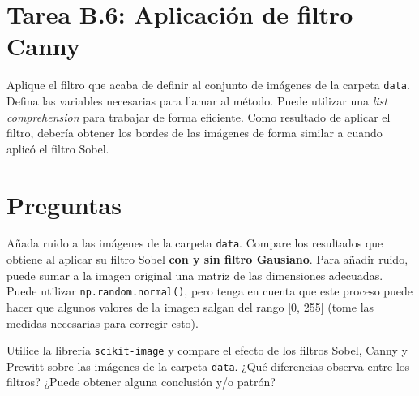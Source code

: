 \section*{Tarea B.6: Aplicación de filtro Canny}
{}

Aplique el filtro que acaba de definir al conjunto de imágenes de la carpeta \texttt{data}. Defina las variables necesarias para llamar al método. Puede utilizar una \textit{list comprehension} para trabajar de forma eficiente. Como resultado de aplicar el filtro, debería obtener los bordes de las imágenes de forma similar a cuando aplicó el filtro Sobel.

\section*{Preguntas}

\vspace{5mm}
\begin{tcolorbox}[colback=gray!10, colframe=gray!30, coltitle=black, title=Pregunta B.1, halign=left]
Añada ruido a las imágenes de la carpeta \texttt{data}. Compare los resultados que obtiene al aplicar su filtro Sobel \textbf{con y sin filtro Gausiano}. Para añadir ruido, puede sumar a la imagen original una matriz de las dimensiones adecuadas. Puede utilizar \texttt{np.random.normal()}, pero tenga en cuenta que este proceso puede hacer que algunos valores de la imagen salgan del rango [0, 255] (tome las medidas necesarias para corregir esto).
\end{tcolorbox}

\vspace{5mm}
\begin{tcolorbox}[colback=gray!10, colframe=gray!30, coltitle=black, title=Pregunta B.2, halign=left]
Utilice la librería \texttt{scikit-image} y compare el efecto de los filtros Sobel, Canny y Prewitt sobre las imágenes de la carpeta \texttt{data}. ¿Qué diferencias observa entre los filtros? ¿Puede obtener alguna conclusión y/o patrón?
\end{tcolorbox}